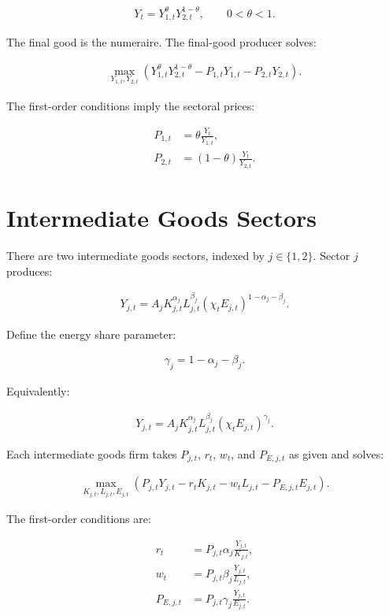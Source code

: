 \documentclass[12pt]{article}
\begin{document}
\begin{align}
Y_t
=
Y_{1,t}^{\theta}
Y_{2,t}^{1-\theta},
\qquad
0 < \theta < 1.
\end{align}

The final good is the numeraire. The final-good producer solves:

\begin{align}
\max_{Y_{1,t},Y_{2,t}}
\left(
Y_{1,t}^{\theta}Y_{2,t}^{1-\theta}
-
P_{1,t}Y_{1,t}
-
P_{2,t}Y_{2,t}
\right).
\end{align}

The first-order conditions imply the sectoral prices:

\begin{align}
P_{1,t}
&=
\theta
\frac{Y_t}{Y_{1,t}},
\\
P_{2,t}
&=
(1-\theta)
\frac{Y_t}{Y_{2,t}}.
\end{align}

\section{Intermediate Goods Sectors}

There are two intermediate goods sectors, indexed by \(j \in \{1,2\}\). Sector \(j\) produces:

\begin{align}
Y_{j,t}
=
A_j
K_{j,t}^{\alpha_j}
L_{j,t}^{\beta_j}
(\chi_t E_{j,t})^{1-\alpha_j-\beta_j}.
\end{align}

Define the energy share parameter:

\begin{align}
\gamma_j
=
1-\alpha_j-\beta_j.
\end{align}

Equivalently:

\begin{align}
Y_{j,t}
=
A_j
K_{j,t}^{\alpha_j}
L_{j,t}^{\beta_j}
(\chi_t E_{j,t})^{\gamma_j}.
\end{align}

Each intermediate goods firm takes \(P_{j,t}\), \(r_t\), \(w_t\), and \(P_{E,j,t}\) as given and solves:

\begin{align}
\max_{K_{j,t},L_{j,t},E_{j,t}}
\left(
P_{j,t}Y_{j,t}
-
r_t K_{j,t}
-
w_t L_{j,t}
-
P_{E,j,t}E_{j,t}
\right).
\end{align}

The first-order conditions are:

\begin{align}
r_t
&=
P_{j,t}
\alpha_j
\frac{Y_{j,t}}{K_{j,t}},
\\
w_t
&=
P_{j,t}
\beta_j
\frac{Y_{j,t}}{L_{j,t}},
\\
P_{E,j,t}
&=
P_{j,t}
\gamma_j
\frac{Y_{j,t}}{E_{j,t}}.
\end{align}
\end{document}
